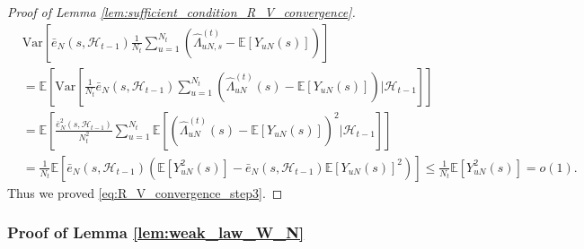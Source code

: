 \documentclass[12pt]{article}
\newcommand{\E}{\mathbb E}								%
\begin{document}
\begin{proof}[Proof of Lemma \ref{lem:sufficient_condition_R_V_convergence}]
	\begin{align*}
		&
		\mathrm{Var}\left[\bar e_N(s,\mathcal{H}_{t-1})\frac{1}{N_t}\sum_{u=1}^{N_t}(\hat{\Lambda}_{uN,s}^{(t)}-\E[Y_{uN}(s)])\right]\\
		&
		=\E\left[\mathrm{Var}\left[\frac{1}{N_t}\bar e_N(s,\mathcal{H}_{t-1})\sum_{u=1}^{N_t}\left(\hat{\Lambda}_{uN}^{(t)}(s)-\E[Y_{uN}(s)]\right)|\mathcal{H}_{t-1}\right]\right]\\
		&
		=\E\left[\frac{\bar e_N^2(s,\mathcal{H}_{t-1})}{N_t^2}\sum_{u=1}^{N_t}\E\left[\left(\hat{\Lambda}_{uN}^{(t)}(s)-\E[Y_{uN}(s)]\right)^2|\mathcal{H}_{t-1}\right]\right]\\
		&
		=\frac{1}{N_t}\E\left[\bar e_N(s,\mathcal{H}_{t-1})\left(\E\left[Y_{uN}^2(s)\right]-\bar e_N(s,\mathcal{H}_{t-1}) \E[Y_{uN}(s)]^2\right)\right]\leq \frac{1}{N_t}\E[Y_{uN}^2(s)]=o(1).
	\end{align*}
	Thus we proved \eqref{eq:R_V_convergence_step3}. 
\end{proof}



\subsubsection{Proof of Lemma \ref{lem:weak_law_W_N}}
\end{document}

